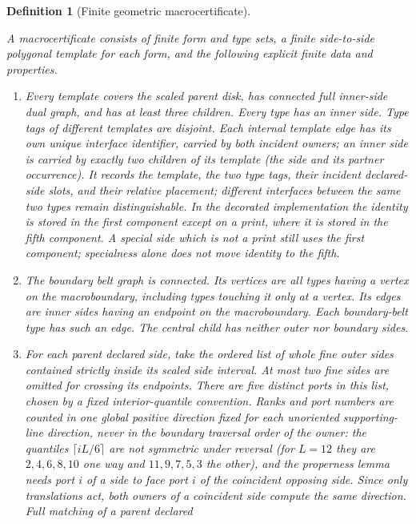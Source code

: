 \documentclass[11pt,a4paper]{article}
\newtheorem{definition}{Definition}[section]
\theoremstyle{remark}
\newcommand{\lean}[1]{}
\newcommand{\uses}[1]{}
\begin{document}
\begin{definition}[Finite geometric macrocertificate]
\label{def:certificate}
\lean{Tilings.Geometry.MacroCertificate}
\uses{def:polygon,def:protoset,def:placed,def:substitution,def:sts,def:mesh}
A macrocertificate consists of finite form and type sets, a finite
side-to-side polygonal template for each form, and the following explicit
finite data and properties.
\begin{enumerate}
\item[(G1)] Every template covers the scaled parent disk, has connected
full inner-side dual graph, and has at least three children.  Every type
has an inner side.  Type tags of different templates are disjoint.
Each internal template edge has its own unique interface identifier,
carried by both incident owners; an inner side is carried by exactly two
children of its template (the side and its partner occurrence).  It records the template, the two type
tags, their incident declared-side slots, and their relative placement;
different interfaces between the same two types remain distinguishable.
In the decorated implementation the identity is
stored in the first component except on a print, where it is stored in
the fifth component.  A special side which is not a print still uses the
first component; specialness alone does not move identity to the fifth.
\item[(G2)] The boundary belt graph is connected.  Its vertices are
\emph{all} types having a vertex on the macroboundary, including types
touching it only at a vertex.  Its edges are inner sides having an endpoint
on the macroboundary.  Each boundary-belt type has such an edge.  The
central child has neither outer nor boundary sides.
\item[(G3)] For each parent declared side, take the ordered list of whole
fine outer sides contained strictly inside its scaled side interval.
At most two fine sides are omitted for crossing its endpoints.  There
are five distinct ports in this list, chosen by a fixed interior-quantile
convention.  Ranks and port numbers are counted in one global positive
direction fixed for each unoriented supporting-line direction, never in
the boundary traversal order of the owner: the quantiles
$\lceil iL/6\rceil$ are not symmetric under reversal (for $L=12$ they are
$2,4,6,8,10$ one way and $11,9,7,5,3$ the other), and the properness
lemma needs port $i$ of a side to face port $i$ of the coincident
opposing side.  Since only translations act, both owners of a coincident
side compute the same direction.  Full matching of a parent declared

\end{enumerate}
\end{definition}
\end{document}
